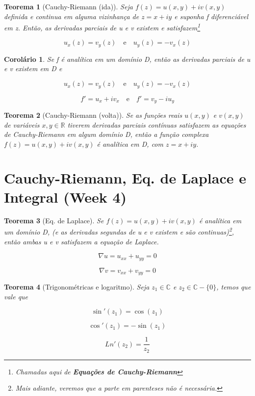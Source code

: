 \documentclass{article}
\newtheorem{theorem}{Teorema}
\newtheorem{corollary}{Corolário}[theorem]
\begin{document}
\begin{theorem}[Cauchy-Riemann (ida)]
Seja $f(z) = u(x, y) + i v(x, y)$ definida e continua em alguma vizinhança de $z = x + i y$ e suponha f diferenciável em z. Então, as derivadas parciais de u e v existem e satisfazem\footnote{Chamadas aqui de \textbf{Equações de Cauchy-Riemann}}

$$u_x(z) = v_y(z)\quad\text{e}\quad u_y(z) = - v_x(z)$$
\end{theorem}

\begin{corollary}
Se f é analítica em um domínio D, então as derivadas parciais de u e v existem em D e

$$u_x(z) = v_y(z)\quad \text{e} \quad u_y(z) = - v_x(z)$$

$$f' = u_x + i v_x\quad \text{e} \quad f' = v_y - i u_y$$
\end{corollary}

\begin{theorem}[Cauchy-Riemann (volta)]
Se as funções reais $u(x, y)$ e $v(x, y)$ de variáveis $x, y \in \mathbb{R}$ tiverem derivadas parciais contínuas satisfazem as equações de Cauchy-Riemann em algum domínio D, então a função complexa $f(z) = u(x, y) + i v(x, y)$ é analítica em D, com $z = x + iy$.
\end{theorem}

\section*{Cauchy-Riemann, Eq. de Laplace e Integral (Week 4)}
\label{s4}
\begin{theorem}[Eq. de Laplace]
Se $f(z) = u(x, y) + i v(x, y)$ é analítica em um domínio D, (e as derivadas segundas de u e v existem e são continuas)\footnote{Mais adiante, veremos que a parte em parenteses não é necessária.}, então ambas u e v satisfazem a equação de Laplace.

$$\nabla u = u_{xx} + u_{yy} = 0$$

$$\nabla v = v_{xx} + v_{yy} = 0$$
\end{theorem}

\begin{theorem}[Trigonométricas e logaritmo]
Seja $z_1 \in \mathbb{C}$ e $z_2 \in \mathbb{C} - \{ 0 \}$, temos que vale que

$$\sin'(z_1) = \cos(z_1)$$

$$\cos'(z_1) = - \sin(z_1)$$

$$Ln'(z_2) = \frac{1}{z_2}$$
\end{theorem}
\end{document}
